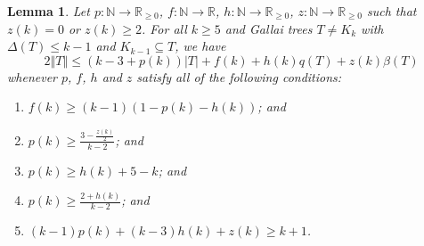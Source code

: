 \documentclass[10pt]{article}
\theoremstyle{plain}
\newtheorem{lem}[thm]{Lemma}
\theoremstyle{definition}
\theoremstyle{remark}
\newcommand{\IN}{\mathbb{N}}
\newcommand{\IR}{\mathbb{R}}
\newcommand{\card}[1]{\left|#1\right|}
\newcommand{\size}[1]{\left\Vert#1\right\Vert}
\newcommand{\func}[3]{#1\colon #2 \rightarrow #3}
\begin{document}
\begin{lem}\label{bwkk1}
	Let $\func{p}{\IN}{\IR_{\ge 0}}$, $\func{f}{\IN}{\IR}$, $\func{h}{\IN}{\IR_{\ge 0}}$, $\func{z}{\IN}{\IR_{\ge 0}}$ such that $z(k) = 0$ or $z(k) \ge 2$.
	For all $k \ge 5$ and Gallai trees $T \ne K_k$ with $\Delta(T) \le k-1$ and $K_{k-1} \subseteq T$, we have
	\[2\size{T} \le (k-3 + p(k))\card{T} + f(k) + h(k)q(T) + z(k)\beta(T)\]
	whenever $p$, $f$, $h$ and $z$ satisfy all of the following conditions:
	\begin{enumerate}
		\item[(1)] $f(k) \ge (k-1)(1- p(k) - h(k))$; and	
	    \item[(2)] $p(k) \ge \frac{3 - \frac{z(k)}{2}}{k-2}$; and
		\item[(3)] $p(k) \ge h(k) + 5 - k$; and
		\item[(4)] $p(k) \ge \frac{2+h(k)}{k-2}$; and
		\item[(5)] $(k-1)p(k) + (k-3)h(k) + z(k)\ge k+1$.
	\end{enumerate}
\end{lem}
\end{document}
